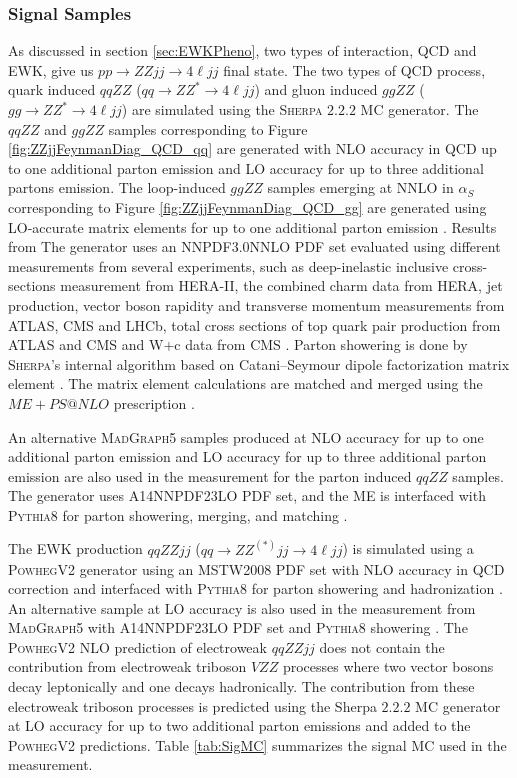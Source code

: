 \subsubsection{Signal Samples}
\label{subsubsec:SigSamples}
As discussed in section \ref{sec:EWKPheno}, two types of interaction, QCD and EWK, give us $pp \rightarrow ZZjj\rightarrow 4 \ell jj$ final state. The two types of QCD process, quark induced $qqZZ$ ($qq \rightarrow ZZ^* \rightarrow 4 \ell jj$) and gluon induced $ggZZ$ ($gg \rightarrow ZZ^* \rightarrow 4\ell jj$) are simulated using the \textsc{Sherpa} $2.2.2$ MC generator. The $qqZZ$ and $ggZZ$ samples corresponding to Figure \ref{fig:ZZjjFeynmanDiag_QCD_qq} are generated with NLO accuracy in QCD up to one additional parton emission and LO accuracy for up to three additional partons emission. The loop-induced $ggZZ$ samples emerging at NNLO in $\alpha_{S}$ corresponding to Figure \ref{fig:ZZjjFeynmanDiag_QCD_gg} are generated using LO-accurate matrix elements for up to one additional parton emission \cite{EventGenWithSherpa}. Results from The generator uses an NNPDF3.0NNLO PDF set evaluated using different measurements from several experiments, such as deep-inelastic inclusive cross-sections measurement from HERA-II, the combined charm data from HERA, jet production, vector boson rapidity and transverse momentum measurements from ATLAS, CMS and LHCb, total cross sections of top quark pair production from ATLAS and CMS and W+c data from CMS \cite{PDFForRunII}. Parton showering is done by \textsc{Sherpa}'s internal algorithm based on Catani–Seymour dipole factorization matrix element \cite{SherpaPS}. The matrix element calculations are matched and merged using the $ME+PS@NLO$ prescription \cite{PSMatching}. 

An alternative \textsc{MadGraph5} samples produced at NLO accuracy for up to one additional parton emission and LO accuracy for up to three additional parton emission \cite{MADGRAPHNLO} are also used in the measurement for the parton induced $qqZZ$ samples. The generator uses A14NNPDF23LO PDF set, and the ME is interfaced with \textsc{Pythia8} for parton showering, merging, and matching \cite{Pythia8}. 

The EWK production $qqZZjj$ ($qq \rightarrow ZZ^{(*)}jj \rightarrow 4 \ell jj$) is simulated using a \textsc{PowhegV2} generator using an MSTW2008 PDF set with NLO accuracy in QCD correction and interfaced with \textsc{Pythia8} for parton showering and hadronization \cite{PowhegV2}. An alternative sample at LO accuracy is also used in the measurement from \textsc{MadGraph5} with A14NNPDF23LO PDF set and \textsc{Pythia8} showering \cite{MADGRAPHNLO}. The \textsc{PowhegV2} NLO prediction of electroweak $qqZZjj$ does not contain the contribution from electroweak triboson $VZZ$ processes where two vector bosons decay leptonically and one decays hadronically. The contribution from these electroweak triboson processes is predicted using the {Sherpa} $2.2.2$ MC generator at LO accuracy for up to two additional parton emissions and added to the \textsc{PowhegV2} predictions. Table \ref{tab:SigMC} summarizes the signal MC used in the measurement. 

